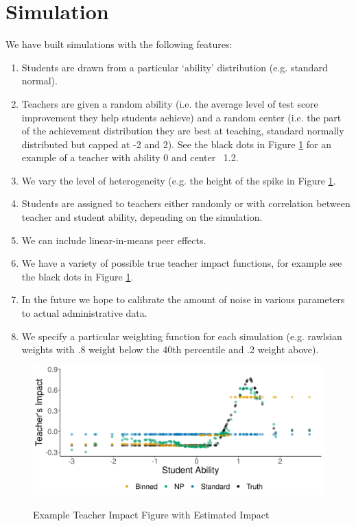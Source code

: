 \documentclass[letterpaper,12pt]{article}
\begin{document}

\section{Simulation}

We have built simulations with the following features:

\begin{enumerate}
    \item Students are drawn from a particular `ability' distribution (e.g. standard normal).
    \item Teachers are given a random ability (i.e. the average level of test score improvement they help students achieve) and a random center (i.e. the part of the achievement distribution they are best at teaching, standard normally distributed but capped at -2 and 2). See the black dots in Figure \ref{fig:teacher_ex} for an example of a teacher with ability 0 and center ~1.2.
    \item We vary the level of heterogeneity (e.g. the height of the spike in Figure \ref{fig:teacher_ex}.
    \item Students are assigned to teachers either randomly or with correlation between teacher and student ability, depending on the simulation.
    \item We can include linear-in-means peer effects.
    \item We have a variety of possible true teacher impact functions, for example see the black dots in Figure \ref{fig:teacher_ex}.
    \item In the future we hope to calibrate the amount of noise in various parameters to actual administrative data.
    \item We specify a particular weighting function for each simulation (e.g. rawlsian weights with .8 weight below the 40th percentile and .2 weight above).
\end{enumerate}


\begin{figure}[ht]
    \centering
    \caption{Example Teacher Impact Figure with Estimated Impact}
    \includegraphics[width=.9\textwidth]{slides/CIERS_Figures/teacher_example_1.png}
    \label{fig:teacher_ex}
\end{figure}
\end{document}
